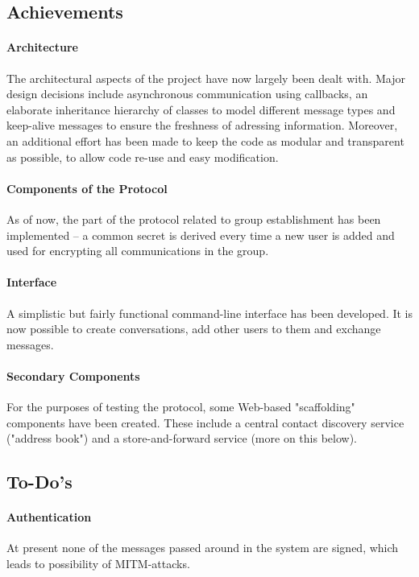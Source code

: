 \documentclass[12pt, a4paper]{article}
\begin{document}
\subsection{Achievements}
\paragraph{Architecture}
The architectural aspects of the project have now largely been dealt with. Major design decisions include asynchronous communication using callbacks, an elaborate inheritance hierarchy of classes to model different message types and keep-alive messages to ensure the freshness of adressing information. Moreover, an additional effort has been made to keep the code as modular and transparent as possible, to allow code re-use and easy modification.

\paragraph{Components of the Protocol}
As of now, the part of the protocol related to group establishment has been implemented -- a common secret is derived every time a new user is added and used for encrypting all communications in the group.


\paragraph{Interface} A simplistic but fairly functional command-line interface has been developed. It is now possible to create conversations, add other users to them and exchange messages.

\paragraph{Secondary Components} For the purposes of testing the protocol, some Web-based "scaffolding" components have been created. These include a central contact discovery service ("address book") and a store-and-forward service (more on this below).

\subsection{To-Do's}

\paragraph{Authentication}
At present none of the messages passed around in the system are signed, which leads to possibility of MITM-attacks.
\end{document}
